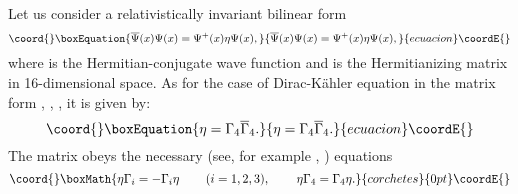 \documentclass[a4paper,12pt]{article}
\begin{document}
Let us consider a relativistically invariant bilinear form
\begin{equation}\coord{}\boxEquation{
\overline{\Psi }(x)\Psi (x)=\Psi ^{+}(x)\eta \Psi (x) , \label{50}
}{
\overline{\Psi }(x)\Psi (x)=\Psi ^{+}(x)\eta \Psi (x) , }{ecuacion}\coordE{}\end{equation}
where \myHighlight{$\Psi ^{+}$}\coordHE{} is the Hermitian-conjugate wave function and
\myHighlight{$\eta$}\coordHE{} is the Hermitianizing matrix in 16-dimensional space. As
for the case of Dirac-K\"{a}hler equation in the matrix form
\cite{Borgardt}, \cite{Kruglov1}, \cite{monogr}, it is given by:
\begin{equation}\coord{}\boxEquation{
\eta =\Gamma _4\overline{\Gamma }_4 . \label{51}
}{
\eta =\Gamma _4\overline{\Gamma }_4 . }{ecuacion}\coordE{}\end{equation}
The matrix \myHighlight{$\eta$}\coordHE{} obeys the necessary (see, for example
\cite{Bogush}, \cite{Fedorov}) equations
\[\coord{}\boxMath{
\eta \Gamma _i=-\Gamma _i\eta \hspace{0.3in}(i=1,2,3) ,
\hspace{0.3in}\eta \Gamma _4=\Gamma _4\eta .
}{corchetes}{0pt}\coordE{}\]
\end{document}
